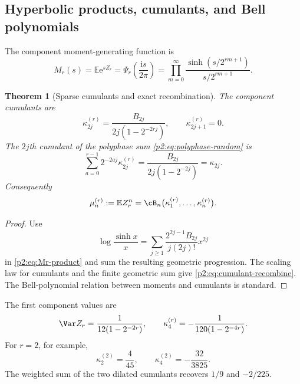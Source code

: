 \documentclass[11pt,oneside]{article}
\newtheorem{theorem}{Theorem}[section]
\theoremstyle{definition}
\newcommand{\e}{\mathrm e}
\newcommand{\ii}{\mathrm i}
\newcommand{\E}{\mathbb E}
\begin{document}
\subsection{Hyperbolic products, cumulants, and Bell polynomials}

The component moment-generating function is
\begin{equation}
 M_r(s)=\E\e^{sZ_r}
 =\Psi_r\!\left(\frac{\ii s}{2\pi}\right)
 =\prod_{m=0}^{\infty}
   \frac{\sinh(s/2^{rm+1})}{s/2^{rm+1}}.                   \label{p2:eq:Mr-product}
\end{equation}

\begin{theorem}[Sparse cumulants and exact recombination]
\label{p2:thm:sparse-cumulants}
The component cumulants are
\begin{equation}
 \kappa_{2j}^{(r)}
 =\frac{B_{2j}}{2j(1-2^{-2rj})},
 \qquad \kappa_{2j+1}^{(r)}=0.                             \label{p2:eq:sparse-cumulants}
\end{equation}
The $2j$th cumulant of the polyphase sum
\eqref{p2:eq:polyphase-random} is
\begin{equation}
 \sum_{a=0}^{r-1}2^{-2aj}\kappa_{2j}^{(r)}
 =\frac{B_{2j}}{2j(1-2^{-2j})}=\kappa_{2j}.                \label{p2:eq:cumulant-recombine}
\end{equation}
Consequently
\begin{equation}
 \mu_n^{(r)}:=\E Z_r^n
 =\cB_n\bigl(\kappa_1^{(r)},\ldots,\kappa_n^{(r)}\bigr).   \label{p2:eq:sparse-Bell-moments}
\end{equation}
\end{theorem}

\begin{proof}
Use
\[
 \log\frac{\sinh x}{x}
 =\sum_{j\ge1}\frac{2^{2j-1}B_{2j}}{j(2j)!}x^{2j}
\]
in \eqref{p2:eq:Mr-product} and sum the resulting geometric progression.  The
scaling law for cumulants and the finite geometric sum give
\eqref{p2:eq:cumulant-recombine}.  The Bell-polynomial relation between moments
and cumulants is standard.
\end{proof}

The first component values are
\begin{equation}
 \Var Z_r=\frac1{12(1-2^{-2r})},
 \qquad
 \kappa_4^{(r)}=-\frac1{120(1-2^{-4r})}.                   \label{p2:eq:sparse-first-cumulants}
\end{equation}
For $r=2$, for example,
\begin{equation}
 \kappa_2^{(2)}=\frac4{45},\qquad
 \kappa_4^{(2)}=-\frac{32}{3825}.                          \label{p2:eq:r2-cumulants}
\end{equation}
The weighted sum of the two dilated cumulants recovers $1/9$ and $-2/225$.
\end{document}
